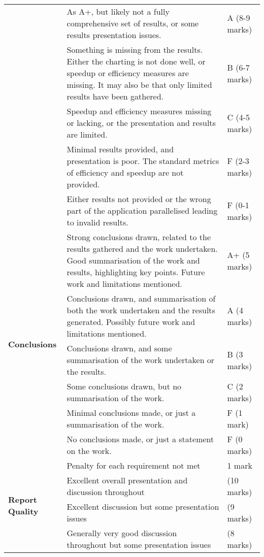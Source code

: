 \documentclass[a4paper, 12pt]{article}
\begin{document}
\begin{table}[H]
\begin{tabularx}{\textwidth}{|l|X|l|}
		\cline{2-3}
		& As A+, but likely not a fully comprehensive set of results, or some results presentation issues. & A (8-9 marks) \\
		\cline{2-3}
		& Something is missing from the results. Either the charting is not done well, or speedup or efficiency measures are missing. It may also be that only limited results have been gathered. & B (6-7 marks) \\
		\cline{2-3}
		& Speedup and efficiency measures missing or lacking, or the presentation and results are limited. & C (4-5 marks) \\
		\cline{2-3}
		& Minimal results provided, and presentation is poor. The standard metrics of efficiency and speedup are not provided. & F (2-3 marks) \\
		\cline{2-3}
		& Either results not provided or the wrong part of the application parallelised leading to invalid results. & F (0-1 marks) \\
		\hline
		\multirow{6}{*}{\textbf{Conclusions}} & Strong conclusions drawn, related to the results gathered and the work undertaken. Good summarisation of the work and results, highlighting key	points. Future work and limitations mentioned. & A+ (5 marks) \\
		\cline{2-3}
		& Conclusions drawn, and summarisation of both the work undertaken and the results generated. Possibly future work and limitations mentioned. & A (4 marks) \\
		\cline{2-3}
		& Conclusions drawn, and some summarisation of the work undertaken or the results. & B (3 marks) \\
		\cline{2-3} 
		& Some conclusions drawn, but no summarisation of the work. & C (2 marks) \\
		\cline{2-3}
		& Minimal conclusions made, or just a summarisation of the work. & F (1 mark) \\
		\cline{2-3}
		& No conclusions made, or just a statement on the work. & F (0 marks) \\
		\hline
		\multirow{6}{*}{\textbf{Report Quality}} & Penalty for each requirement not met & 1 mark \\
		\cline{2-3}
		& Excellent overall presentation and discussion throughout & (10 marks) \\
		\cline{2-3}
		& Excellent discussion but some presentation issues & (9 marks) \\
		\cline{2-3}
		& Generally very good discussion throughout but some presentation issues & (8 marks) \\
		\cline{2-3}

\end{tabularx}
\end{table}
\end{document}
